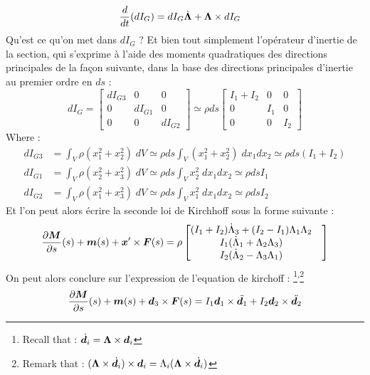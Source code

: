 \begin{equation}
	\begin{aligned}
		\frac{d}{dt}(dI_G) &= dI_G\dot{\boldsymbol{\Lambda}} + \boldsymbol{\Lambda}\times dI_G
	\end{aligned}
\end{equation}
Qu'est ce qu'on met dans $dI_G$ ? Et bien tout simplement l'opérateur d'inertie de la section, qui s'exprime à l'aide des moments quadratiques des directions principales de la façon suivante, dans la base des directions principales d'inertie au premier ordre en $ds$ :
\begin{equation}
	dI_G =
	 \begin{bmatrix}
			dI_{G3} & 0 & 0 \\
			0 & dI_{G1} & 0 \\
			0 & 0 & dI_{G2}
	\end{bmatrix}
	\simeq \rho ds
		\begin{bmatrix}
			I_1 + I_2 & 0 & 0 \\
			0 & I_1 & 0 \\
			0 & 0 & I_2
		\end{bmatrix}
\end{equation}
Where :
\begin{subequations}
	\begin{align}
		dI_{G3} &= \int_V \rho (x_1^2+ x_2^2)\;dV
		\simeq \rho ds \int_V (x_1^2+x_2^2)\;dx_1dx_2
		\simeq \rho ds (I_1 + I_2)
		\\
		dI_{G1} &= \int_V \rho (x_2^2+ x_3^2)\;dV
		\simeq \rho ds \int_V x_2^2\;dx_1dx_2
		\simeq \rho ds I_1
		\\
		dI_{G2} &= \int_V \rho (x_1^2+ x_3^2)\;dV
		\simeq \rho ds \int_V x_1^2\;dx_1dx_2
		\simeq \rho ds I_2
	\end{align}
\end{subequations}
Et l'on peut alors écrire la seconde loi de Kirchhoff sous la forme suivante :
\begin{equation}
	\begin{aligned}
		\frac{\partial \boldsymbol{M}}{\partial s}(s)+\boldsymbol{m}(s) + \boldsymbol{x}'\times \boldsymbol{F}(s)
		= \rho
			\begin{bmatrix}
				(I_1 + I_2)\dot{\Lambda}_3 + (I_2 - I_1)\Lambda_1\Lambda_2&\\
				I_1 (\dot{\Lambda}_1 + \Lambda_2 \Lambda_3) &\\
				I_2 (\dot{\Lambda}_2 - \Lambda_3 \Lambda_1) &
			\end{bmatrix}
	\end{aligned}
\end{equation}
On peut alors conclure sur l'expression de l'equation de kirchoff : \footnote{Recall that : $\dot{\boldsymbol{d}_i} = \boldsymbol{\Lambda} \times \boldsymbol{d}_i$}\textsuperscript{,}\footnote{Remark that : $(\boldsymbol{\Lambda}\times\dot{\boldsymbol{d}_i})\times\boldsymbol{d}_i = \Lambda_i(\boldsymbol{\Lambda}\times\dot{\boldsymbol{d}_i})$}
\begin{equation}
	\frac{\partial \boldsymbol{M}}{\partial s}(s)+\boldsymbol{m}(s) + \boldsymbol{d}_3 \times \boldsymbol{F}(s) = I_1 \boldsymbol{d}_1 \times \ddot{\boldsymbol{d}_1} + I_2 \boldsymbol{d}_2 \times \ddot{\boldsymbol{d}_2}
\end{equation}

